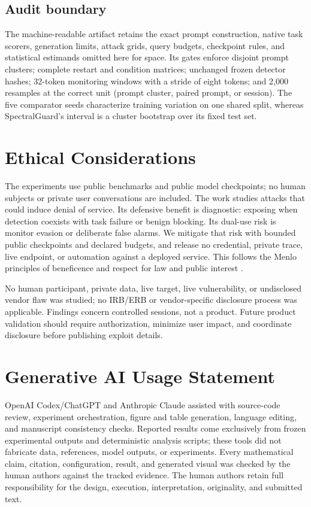 \documentclass[sigconf]{acmart}
\begin{document}
\subsection{Audit boundary}
The machine-readable artifact retains the exact prompt construction, native
task scorers, generation limits, attack grids, query budgets, checkpoint rules,
and statistical estimands omitted here for space. Its gates enforce disjoint
prompt clusters; complete restart and condition matrices; unchanged frozen
detector hashes; 32-token monitoring windows with a stride of eight tokens; and
2,000 resamples at the correct unit (prompt cluster, paired prompt, or session).
The five comparator seeds characterize training variation on one shared split,
whereas SpectralGuard's interval is a cluster bootstrap over its fixed test set.

\section{Ethical Considerations}
The experiments use public benchmarks and public model checkpoints; no human
subjects or private user conversations are included. The work studies attacks
that could induce denial of service. Its defensive benefit is diagnostic: exposing when
detection coexists with task failure or benign blocking. Its dual-use risk is
monitor evasion or deliberate false alarms. We mitigate that risk with bounded
public checkpoints and declared budgets, and release no credential, private
trace, live endpoint, or automation against a deployed service. This follows
the Menlo principles of beneficence and respect for law and public interest
\cite{bailey2012menlo}.

No human participant, private data, live target, live vulnerability, or undisclosed
vendor flaw was studied; no IRB/ERB or vendor-specific disclosure process was
applicable. Findings concern controlled sessions, not a product.
Future product validation should require authorization, minimize user impact,
and coordinate disclosure before publishing exploit details.

\section{Generative AI Usage Statement}
OpenAI Codex/ChatGPT and Anthropic Claude assisted with source-code review,
experiment orchestration, figure and table generation, language editing, and
manuscript consistency checks. Reported results come exclusively from frozen
experimental outputs and deterministic analysis scripts; these tools did not
fabricate data, references, model outputs, or experiments. Every mathematical
claim, citation, configuration, result, and generated visual was checked by the
human authors against the tracked evidence. The human authors retain full
responsibility for the design, execution, interpretation, originality, and
submitted text.
\end{document}
